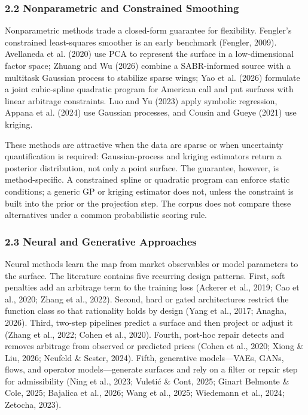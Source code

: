 \documentclass[11pt]{article}
\begin{document}
\subsubsection*{2.2 Nonparametric and Constrained Smoothing}
Nonparametric methods trade a closed-form guarantee for flexibility. Fengler’s constrained least-squares smoother is an early benchmark (Fengler, 2009). Avellaneda et al. (2020) use PCA to represent the surface in a low-dimensional factor space; Zhuang and Wu (2026) combine a SABR-informed source with a multitask Gaussian process to stabilize sparse wings; Yao et al. (2026) formulate a joint cubic-spline quadratic program for American call and put surfaces with linear arbitrage constraints. Luo and Yu (2023) apply symbolic regression, Appana et al. (2024) use Gaussian processes, and Cousin and Gueye (2021) use kriging.

These methods are attractive when the data are sparse or when uncertainty quantification is required: Gaussian-process and kriging estimators return a posterior distribution, not only a point surface. The guarantee, however, is method-specific. A constrained spline or quadratic program can enforce static conditions; a generic GP or kriging estimator does not, unless the constraint is built into the prior or the projection step. The corpus does not compare these alternatives under a common probabilistic scoring rule.

\subsubsection*{2.3 Neural and Generative Approaches}
Neural methods learn the map from market observables or model parameters to the surface. The literature contains five recurring design patterns. First, soft penalties add an arbitrage term to the training loss (Ackerer et al., 2019; Cao et al., 2020; Zhang et al., 2022). Second, hard or gated architectures restrict the function class so that rationality holds by design (Yang et al., 2017; Anagha, 2026). Third, two-step pipelines predict a surface and then project or adjust it (Zhang et al., 2022; Cohen et al., 2020). Fourth, post-hoc repair detects and removes arbitrage from observed or predicted prices (Cohen et al., 2020; Xiong \& Liu, 2026; Neufeld \& Sester, 2024). Fifth, generative models—VAEs, GANs, flows, and operator models—generate surfaces and rely on a filter or repair step for admissibility (Ning et al., 2023; Vuletić \& Cont, 2025; Ginart Belmonte \& Cole, 2025; Bajalica et al., 2026; Wang et al., 2025; Wiedemann et al., 2024; Zetocha, 2023).
\end{document}
